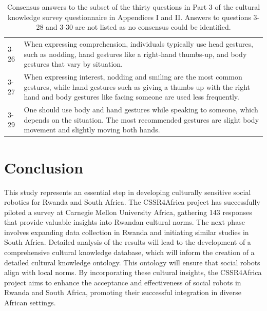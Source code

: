 \documentclass{CSSRforAfrica}
\begin{document}
\begin{table}[H]
\begin{center}
\begin{tabularx}{\linewidth}{|l|X|}
{\small 3-26 } & {\small When expressing comprehension, individuals typically use head gestures, such as nodding, hand gestures like a right-hand thumbs-up, and body gestures that vary by situation.} \\

{\small 3-27 } & {\small When expressing interest, nodding and smiling are the most common gestures, while hand gestures such as giving a thumbs up with the right hand and body gestures like facing someone are used less frequently.} \\

{\small 3-29 } & {\small One should use body and hand gestures while speaking to someone, which depends on the situation. The most recommended gestures are slight body movement and slightly moving both hands.} \\
\hline \hline
\end{tabularx}
\end{center}
\vspace{-5mm}
\caption{ Consensus answers to the subset of the thirty questions in Part 3 of the cultural knowledge survey questionnaire in Appendices I and II. Answers to questions 3-28 and 3-30 are not listed as no consensus could be identified.}
\label{table:AllAnswers3}
\end{table}


\section{Conclusion}
 \label{section:conclusion}

This study represents an essential  step in developing culturally sensitive social robotics for Rwanda and South Africa. The CSSR4Africa project has successfully piloted a survey at Carnegie Mellon University Africa, gathering 143 responses   that provide valuable insights into Rwandan cultural norms. The next phase involves expanding data collection in Rwanda and initiating similar studies in South Africa. Detailed analysis of the results will lead to the development of a comprehensive cultural knowledge database, which will inform the creation of a detailed cultural knowledge ontology. This ontology will ensure that social robots align with local norms. By incorporating these cultural insights, the CSSR4Africa project aims to enhance the acceptance and effectiveness of social robots in Rwanda and South Africa, promoting their successful integration in diverse African settings.
\end{document}
